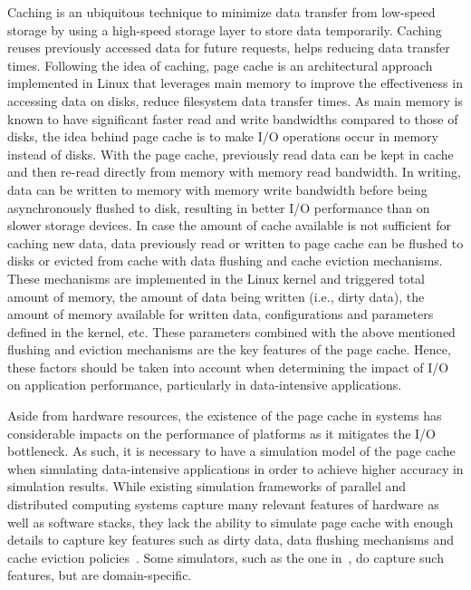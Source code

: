 Caching is an ubiquitous technique to minimize data transfer from 
low-speed storage by using a high-speed storage layer to store data 
temporarily. Caching reuses previously accessed data for future requests, 
 helps reducing data transfer times. 
Following the idea of caching, page cache is an architectural approach 
implemented in Linux that leverages main memory to improve the 
effectiveness in accessing data on disks, reduce filesystem data transfer times.
As main memory is known to have significant faster read and write bandwidths 
compared to those of disks, the idea behind page cache is to make I/O operations 
occur in memory instead of disks.
With the page cache, previously read data can be kept in cache and then re-read 
directly from memory with memory read bandwidth. 
In writing, data can be written to memory with memory write bandwidth 
before being asynchronously flushed to disk, resulting in better I/O performance 
than on slower storage devices. 
In case the amount of cache available is not sufficient for caching new data, 
data previously read or written to page cache can be flushed to disks or 
evicted from cache with data flushing and cache eviction mechanisms. 
These mechanisms are implemented in the Linux kernel and triggered 
 total amount of memory, the amount of data 
being written (i.e., dirty data), the amount of memory available for written data, 
configurations and parameters defined in the kernel, etc.
These parameters combined with the above mentioned flushing and eviction 
mechanisms are the key features of the page cache. 
Hence, these factors should be taken into account when determining the impact 
of I/O on application performance, particularly in data-intensive applications.

Aside from hardware resources, the existence of the page cache in systems has 
considerable impacts on the performance of platforms as it mitigates the I/O 
bottleneck.
As such, it is necessary to have a simulation model of the page cache when 
simulating data-intensive applications in order to achieve higher accuracy  
in simulation results.
While existing simulation frameworks of parallel and distributed computing
systems capture many relevant features of hardware as well as software stacks, 
they lack the ability to simulate page cache with enough details to capture 
key features such as dirty data, data flushing mechanisms and cache eviction 
policies~\cite{nunez2012simcan,nunez2012icancloud}. 
Some simulators, such as the one in~\cite{xu2018saving}, do capture such 
features, but are domain-specific. 

